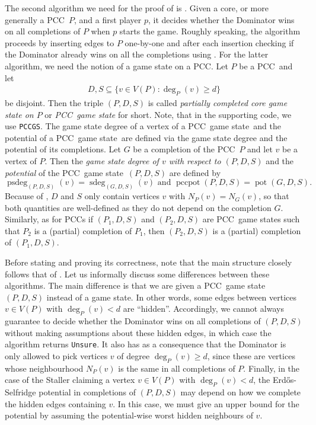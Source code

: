 \documentclass[a4paper,11pt,oneside]{scrartcl}
\theoremstyle{definition}
\theoremstyle{remark}
\DeclareMathOperator{\pot}{pot}
\DeclareMathOperator{\gsdeg}{sdeg}
\DeclareMathOperator{\pccgsdeg}{psdeg}
\DeclareMathOperator{\pccpot}{pccpot}
\newcommand{\pcc}{PCC}
\newcommand{\pccgs}{\pcc\ game state}
\newcommand{\unsure}{\texttt{Unsure}}
\begin{document}
The second algorithm we need for the proof of  is . Given a core, or more generally a \pcc\ $P$, and a first player $p$, it decides whether the Dominator wins on all completions of $P$ when $p$ starts the game. Roughly speaking, the algorithm proceeds by inserting edges to $P$ one-by-one and after each insertion checking if the Dominator already wins on all the completions using . For the latter algorithm, we need the notion of a game state on a \pcc. Let $P$ be a \pcc\ and let 
\begin{align}\label{align:claimed_vertices_in_pccgs_high_deg}
    D, S \subseteq \{v \in V(P) : \deg_P(v) \geq d\}
\end{align}
be disjoint. Then the triple $(P,D,S)$ is called \emph{partially completed core game state on $P$} or \emph{\pccgs} for short. Note, that in the supporting code, we use \texttt{PCCGS}. The game state degree of a vertex of a \pccgs\ and the potential of a \pccgs\ are defined via the game state degree and the potential of its completions.
Let $G$ be a completion of the \pcc\ $P$ and let $v$ be a vertex of $P$. Then the \emph{game state degree of $v$ with respect to $(P,D,S)$} and the \emph{potential} of the \pccgs\ $(P,D,S)$ are defined by
\[
    \pccgsdeg_{(P,D,S)}(v) = \gsdeg_{(G,D,S)}(v) \text{ and } \pccpot(P,D,S) = \pot(G,D,S).
\]
Because of , $D$ and $S$ only contain vertices $v$ with $N_P(v) = N_G(v)$, so that both quantities are well-defined as they do not depend on the completion $G$. Similarly, as for \pcc s if $(P_1,D,S)$ and $(P_2, D,S)$ are \pccgs s such that $P_2$ is a (partial) completion of $P_1$, then $(P_2,D,S)$ is a (partial) completion of $(P_1, D,S)$.

Before stating  and proving its correctness, note that the main structure closely follows that of . Let us informally discuss some differences between these algorithms. The main difference is that we are given a \pccgs\ $(P,D,S)$ instead of a game state. In other words, some edges between vertices $v\in V(P)$ with $\deg_P(v) < d$ are “hidden”. Accordingly, we cannot always guarantee to decide whether the Dominator wins on all completions of $(P,D,S)$ without making assumptions about these hidden edges, in which case the algorithm returns \unsure. It also has as a consequence that the Dominator is only allowed to pick vertices $v$ of degree $\deg_P(v) \geq d$, since these are vertices whose neighbourhood $N_P(v)$ is the same in all completions of $P$. Finally, in the case of the Staller claiming a vertex $v \in V(P)$ with $\deg_P(v) < d$, the Erd\H os-Selfridge potential in completions of $(P,D,S)$ may depend on how we complete the hidden edges containing $v$. In this case, we must give an upper bound for the potential by assuming the potential-wise worst hidden neighbours of $v$. 
\end{document}
